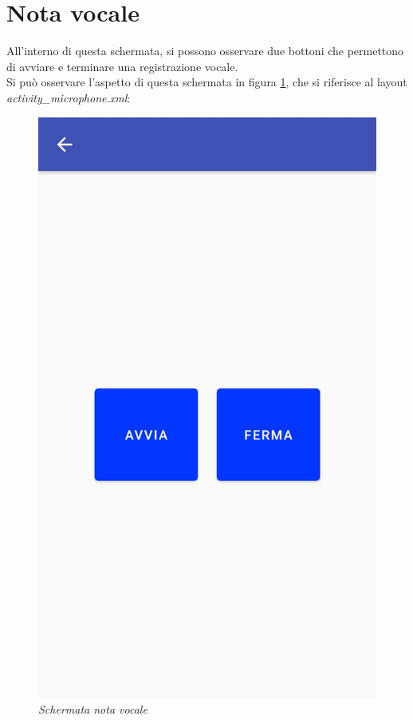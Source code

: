 \section{Nota vocale}
\label{notavocale}
All'interno di questa schermata, si possono osservare due bottoni che permettono di avviare e terminare una registrazione vocale.
\\Si può osservare l'aspetto di questa schermata in figura \ref{fig:notavocale}, che si riferisce al layout \textit{activity\_microphone.xml}:
\begin{figure}[!h]
    \centering
	\includegraphics[scale=0.14]{Tesi/images/AttVocale.jpg}
	\caption{\textit{Schermata nota vocale}}
	\label{fig:notavocale}
\end{figure}
